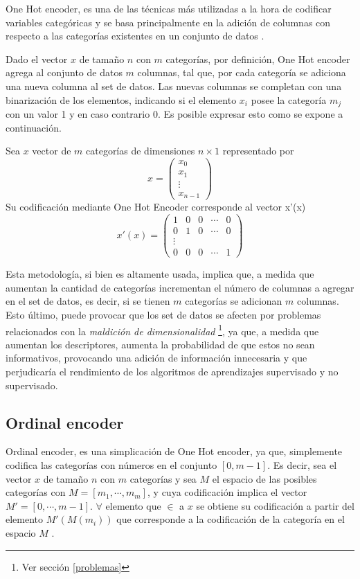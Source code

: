 One Hot encoder, es una de las técnicas más utilizadas a la hora de codificar variables categóricas y se basa principalmente en la adición de columnas con respecto a las categorías existentes en un conjunto de datos \cite{brownlee2017one}.

Dado el vector  $x$ de tamaño $n$ con $m$ categorías, por definición, One Hot encoder agrega al conjunto de datos $m$ columnas, tal que, por cada categoría se adiciona una nueva columna al set de datos. Las nuevas columnas se completan con una binarización de los elementos, indicando si el elemento $x_{i}$ posee la categoría $m_{j}$ con un valor 1 y en caso contrario 0. Es posible expresar esto como se expone a continuación.

Sea $x$ vector de $m$ categorías de dimensiones
$n \times 1$ representado por
\[ x = \left( \begin{array}{ccc}
x_{0}\\
x_{1}\\
\vdots\\
x_{n-1} \end{array} \right)\] 
Su codificación mediante One Hot Encoder corresponde al vector x'(x)
\[ x'(x) = \left( \begin{array}{ccccc}
1 & 0 & 0 & \cdots & 0 \\
0 & 1 & 0 & \cdots & 0 \\
\vdots\\
0 & 0 & 0 & \cdots & 1 \end{array} \right) \] 

Esta metodología, si bien es altamente usada, implica que, a medida que aumentan la cantidad de categorías incrementan el número de columnas a agregar en el set de datos, es decir, si se tienen $m$ categorías se adicionan $m$ columnas. Esto último, puede provocar que los set de datos se afecten por problemas relacionados con la \textit{maldición de dimensionalidad} \footnote{Ver sección \ref{problemas}}, ya que, a medida que aumentan los descriptores, aumenta la probabilidad de que estos no sean informativos, provocando una adición de información innecesaria y que perjudicaría el rendimiento de los algoritmos de aprendizajes supervisado y no supervisado.

\subsection{Ordinal encoder}

Ordinal encoder, es una simplicación de One Hot encoder, ya que, simplemente codifica las categorías con números en el conjunto $[0, m-1]$. Es decir, sea el vector $x$ de tamaño $n$ con $m$ categorías y sea $M$ el espacio de las posibles categorías con $M = [m_{1}, \cdots, m_{m}]$, y cuya codificación implica el vector $M' = [0, \cdots, m-1]$. $\forall $ elemento que $\in$ a $x$ se obtiene su codificación a partir del elemento $M'(M(m_{i}))$ que corresponde a la codificación de la categoría en el espacio $M$ \cite{pedregosa2011scikit}.

